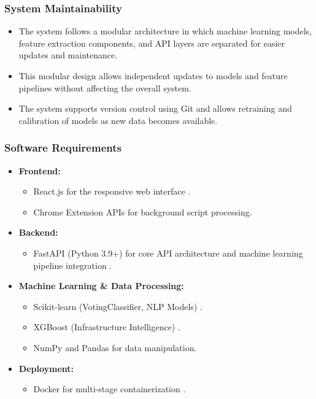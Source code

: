 \subsubsection*{System Maintainability}

\begin{itemize}
    \item The system follows a modular architecture in which machine learning models, feature extraction components, and API layers are separated for easier updates and maintenance.
    
    \item This modular design allows independent updates to models and feature pipelines without affecting the overall system.
    
    \item The system supports version control using Git and allows retraining and calibration of models as new data becomes available.
\end{itemize}

\subsubsection*{Software Requirements}

\begin{itemize}
    \item \textbf{Frontend:}
    \begin{itemize}
        \item React.js for the responsive web interface \cite{ref22}.
        \item Chrome Extension APIs for background script processing.
    \end{itemize}
    
    \item \textbf{Backend:}
    \begin{itemize}
        \item FastAPI (Python 3.9+) for core API architecture and machine learning pipeline integration \cite{ref20}.
    \end{itemize}
    
    \item \textbf{Machine Learning \& Data Processing:}
    \begin{itemize}
        \item Scikit-learn (VotingClassifier, NLP Models) \cite{ref18}.
        \item XGBoost (Infrastructure Intelligence) \cite{ref7, ref19}.
        \item NumPy and Pandas for data manipulation.
    \end{itemize}
    
    \item \textbf{Deployment:}
    \begin{itemize}
        \item Docker for multi-stage containerization \cite{ref21}.
    \end{itemize}
\end{itemize}


